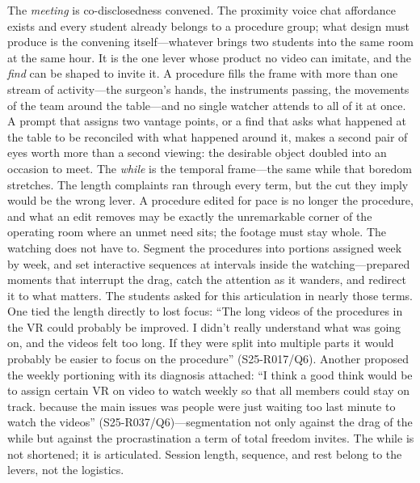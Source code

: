 The \textit{meeting} is co-disclosedness convened. The proximity voice
chat affordance exists and every student already belongs to a procedure
group; what design must produce is the convening itself---whatever
brings two students into the same room at the same hour. It is the one
lever whose product no video can imitate, and the \textit{find} can be
shaped to invite it. A procedure fills the frame with more than one
stream of activity---the surgeon's hands, the instruments passing, the
movements of the team around the table---and no single watcher attends
to all of it at once. A prompt that assigns two vantage points, or a
find that asks what happened at the table to be reconciled with what
happened around it, makes a second pair of eyes worth more than a
second viewing: the desirable object doubled into an occasion to meet.
The \textit{while} is the temporal frame---the same while that boredom
stretches. The length complaints ran through every term, but the cut
they imply would be the wrong lever. A procedure edited for pace is no
longer the procedure, and what an edit removes may be exactly the
unremarkable corner of the operating room where an unmet need sits;
the footage must stay whole. The watching does not have to. Segment
the procedures into portions assigned week by week, and set interactive
sequences at intervals inside the
watching---prepared moments that interrupt the drag, catch the
attention as it wanders, and redirect it to what matters. The students
asked for this articulation in nearly those terms. One tied the length
directly to lost focus: ``The long videos of the procedures in the VR
could probably be improved. I didn't really understand what was going on,
and the videos felt too long. If they were split into multiple parts it
would probably be easier to focus on the procedure'' (S25-R017/Q6).
Another proposed the weekly portioning with its diagnosis attached: ``I
think a good think would be to assign certain VR on video to watch weekly
so that all members could stay on track. because the main issues was
people were just waiting too last minute to watch the videos''
(S25-R037/Q6)---segmentation not only against the drag of the while but
against the procrastination a term of total freedom invites. The while is
not shortened; it is articulated. Session length, sequence, and rest
belong to the levers, not the logistics.

